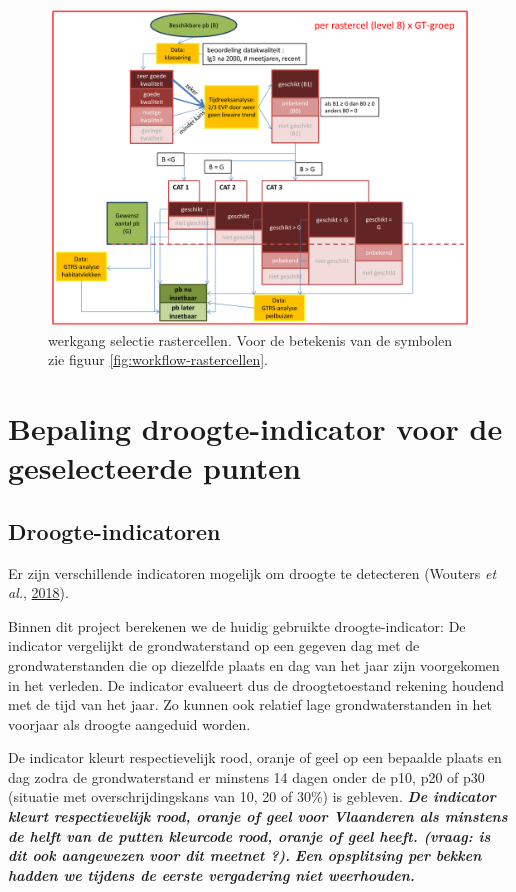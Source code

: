 \documentclass[11pt,]{book}
\begin{document}
\begin{figure}
\includegraphics[width=10in]{./figures/workflow_pbselectie_part2} \caption{werkgang selectie rastercellen. Voor de
betekenis van de symbolen zie figuur \ref{fig:workflow-rastercellen}.}\label{fig:workflow-selectiepb-part2}
\end{figure}

\section{Bepaling droogte-indicator voor de geselecteerde
punten}\label{bepaling-droogte-indicator-voor-de-geselecteerde-punten}

\subsection{Droogte-indicatoren}\label{droogte-indicatoren}

Er zijn verschillende indicatoren mogelijk om droogte te detecteren
(Wouters \emph{et al.}, \protect\hyperlink{ref-RN5703}{2018}).

Binnen dit project berekenen we de huidig gebruikte droogte-indicator:
De indicator vergelijkt de grondwaterstand op een gegeven dag met de
grondwaterstanden die op diezelfde plaats en dag van het jaar zijn
voorgekomen in het verleden. De indicator evalueert dus de
droogtetoestand rekening houdend met de tijd van het jaar. Zo kunnen ook
relatief lage grondwaterstanden in het voorjaar als droogte aangeduid
worden.

De indicator kleurt respectievelijk rood, oranje of geel op een bepaalde
plaats en dag zodra de grondwaterstand er minstens 14 dagen onder de
p10, p20 of p30 (situatie met overschrijdingskans van 10, 20 of 30\%) is
gebleven. \emph{\textbf{De indicator kleurt respectievelijk rood, oranje
of geel voor Vlaanderen als minstens de helft van de putten kleurcode
rood, oranje of geel heeft. (vraag: is dit ook aangewezen voor dit
meetnet ?). }} \emph{\textbf{Een opsplitsing per bekken hadden we
tijdens de eerste vergadering niet weerhouden.}}
\end{document}
